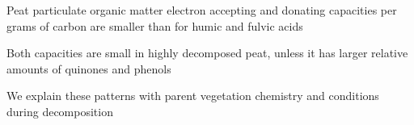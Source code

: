 \documentclass[draft,linenumbers]{agujournal2018}
\begin{document}




\begin{keypoints}
\item Peat particulate organic matter electron accepting and donating
capacities per grams of carbon are smaller than for humic and fulvic
acids
\item Both capacities are small in highly decomposed peat, unless it has
larger relative amounts of quinones and phenols
\item We explain these patterns with parent vegetation chemistry and
conditions during decomposition
\end{keypoints}

%
%

\end{document}
